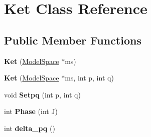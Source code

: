 \hypertarget{classKet}{\section{Ket Class Reference}
\label{classKet}
}
\subsection*{Public Member Functions}
\begin{DoxyCompactItemize}
\item 
\hypertarget{classKet_a6ae7282513e6c7799799a257213c5da2}{{\bfseries Ket} (\hyperlink{classModelSpace}{Model\-Space} $\ast$ms)}\label{classKet_a6ae7282513e6c7799799a257213c5da2}

\item 
\hypertarget{classKet_aaeed062871c0b45d5063813d362841e0}{{\bfseries Ket} (\hyperlink{classModelSpace}{Model\-Space} $\ast$ms, int p, int q)}\label{classKet_aaeed062871c0b45d5063813d362841e0}

\item 
\hypertarget{classKet_a3c9c1e007c9bf334e6d0bea724154aa1}{void {\bfseries Setpq} (int p, int q)}\label{classKet_a3c9c1e007c9bf334e6d0bea724154aa1}

\item 
\hypertarget{classKet_ac07bfbc7c7f2bdf77341ba6d54036e8e}{int {\bfseries Phase} (int J)}\label{classKet_ac07bfbc7c7f2bdf77341ba6d54036e8e}

\item 
\hypertarget{classKet_ac91fa789aa9e8043da735332b9db3e58}{int {\bfseries delta\-\_\-pq} ()}\label{classKet_ac91fa789aa9e8043da735332b9db3e58}

\end{DoxyCompactItemize}
